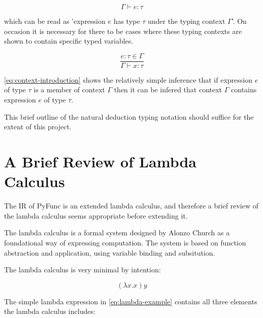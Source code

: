 \documentclass{l4proj}
\begin{document}
\begin{equation} \label{eq:context-example}
    \Gamma \vdash e : \tau
\end{equation}

which can be read as 'expression $e$ has type $\tau$ under the typing context $\Gamma$'. On occasion it is necessary for there to be cases where these typing contexts are shown to contain specific typed variables.

\begin{equation} \label{eq:context-introduction}
    \frac{e:\tau \in \Gamma}{\Gamma \vdash x:\tau}
\end{equation}

\ref{eq:context-introduction} shows the relatively simple inference that if expression $e$ of type $\tau$ is a member of context $\Gamma$ then it can be infered that context $\Gamma$ contains expression $e$ of type $\tau$.

This brief outline of the natural deduction typing notation should suffice for the extent of this project.


\section{A Brief Review of Lambda Calculus} \label{sec:lambda-review}

The IR of PyFunc is an extended lambda calculus, and therefore a brief review of the lambda calculus seems appropriate before extending it.

The lambda calculus is a formal system designed by Alonzo Church as a foundational way of expressing computation.
The system is based on function abstraction and application, using variable binding and subsitution.

The lambda calculus is very minimal by intention:

\begin{equation} \label{eq:lambda-example}
    (\lambda x . x) y
\end{equation}

The simple lambda expression in \ref{eq:lambda-example} contains all three elements the lambda calculus includes:

\begin{table}[!h]
\end{table}
\end{document}
